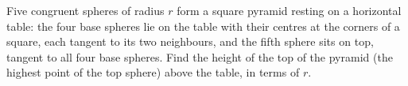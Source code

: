Five congruent spheres of radius $r$ form a square pyramid resting on a horizontal table: the four base spheres lie on the table with their centres at the corners of a square, each tangent to its two neighbours, and the fifth sphere sits on top, tangent to all four base spheres. Find the height of the top of the pyramid (the highest point of the top sphere) above the table, in terms of $r$.
